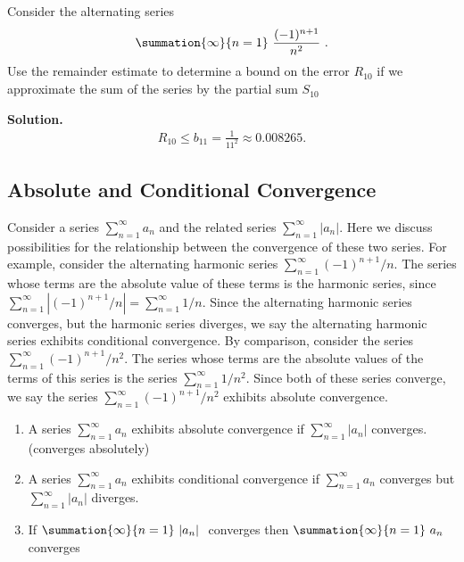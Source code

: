 \documentclass{report}
\begin{document}
    \bigbreak \noindent 
    \begin{eg}
        Consider the alternating series
        \begin{align*}
            \summation{\infty}{n=1}\ \frac{(-1)^{n+1}}{n^{2}}\ 
        .\end{align*}
        \bigbreak \noindent 
        Use the remainder estimate to determine a bound on the error  $R_{10}$ if we approximate the sum of the series by the partial sum  $S_{10}$
    \end{eg}
    \bigbreak \noindent 
    \textbf{Solution.} 
    \begin{align*}
        R_{10} \leq b_{11} = \frac{1}{11^{2}} \approx 0.008265
    .\end{align*}

    \pagebreak 
    \subsection*{Absolute and Conditional Convergence}
    \bigbreak \noindent 
    Consider a series \(\sum_{n=1}^{\infty} a_n\) and the related series \(\sum_{n=1}^{\infty} |a_n|\). Here we discuss possibilities for the relationship between the convergence of these two series. For example, consider the alternating harmonic series \(\sum_{n=1}^{\infty} (-1)^{n+1}/n\). The series whose terms are the absolute value of these terms is the harmonic series, since \(\sum_{n=1}^{\infty} |(-1)^{n+1}/n| = \sum_{n=1}^{\infty} 1/n\). Since the alternating harmonic series converges, but the harmonic series diverges, we say the alternating harmonic series exhibits conditional convergence.
    \bigbreak \noindent 
    By comparison, consider the series \(\sum_{n=1}^{\infty} (-1)^{n+1}/n^2\). The series whose terms are the absolute values of the terms of this series is the series \(\sum_{n=1}^{\infty} 1/n^2\). Since both of these series converge, we say the series \(\sum_{n=1}^{\infty} (-1)^{n+1}/n^2\) exhibits absolute convergence.
    \bigbreak \noindent 
    \begin{definition}
        \begin{enumerate}[label=\roman*.]
            \item A series \(\sum_{n=1}^{\infty} a_n\) exhibits absolute convergence if \(\sum_{n=1}^{\infty} |a_n|\) converges. (converges absolutely)
            \item A series \(\sum_{n=1}^{\infty} a_n\) exhibits conditional convergence if \(\sum_{n=1}^{\infty} a_n\) converges but \(\sum_{n=1}^{\infty} |a_n|\) diverges.
            \item If $\summation{\infty}{n=1}\ \lvert a_{n} \rvert\ $ converges then $\summation{\infty}{n=1}\ a_{n}\ $ converges
        \end{enumerate}
    \end{definition}
\end{document}

